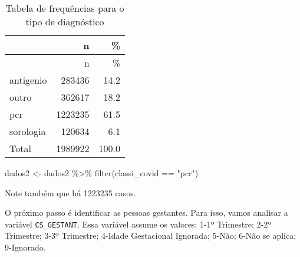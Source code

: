 \documentclass[
]{article}
\newenvironment{Shaded}{\begin{snugshade}}{\end{snugshade}}
\newcommand{\AttributeTok}[1]{\textcolor[rgb]{0.77,0.63,0.00}{#1}}
\newcommand{\CommentTok}[1]{\textcolor[rgb]{0.56,0.35,0.01}{\textit{#1}}}
\newcommand{\ConstantTok}[1]{\textcolor[rgb]{0.00,0.00,0.00}{#1}}
\newcommand{\DecValTok}[1]{\textcolor[rgb]{0.00,0.00,0.81}{#1}}
\newcommand{\FunctionTok}[1]{\textcolor[rgb]{0.00,0.00,0.00}{#1}}
\newcommand{\NormalTok}[1]{#1}
\newcommand{\OtherTok}[1]{\textcolor[rgb]{0.56,0.35,0.01}{#1}}
\newcommand{\SpecialCharTok}[1]{\textcolor[rgb]{0.00,0.00,0.00}{#1}}
\newcommand{\StringTok}[1]{\textcolor[rgb]{0.31,0.60,0.02}{#1}}
\begin{document}
\begin{longtable}[]{@{}lrr@{}}
\caption{Tabela de frequências para o tipo de
diagnóstico}\tabularnewline
\toprule
& n & \% \\
\midrule
\endfirsthead
\toprule
& n & \% \\
\midrule
\endhead
antigenio & 283436 & 14.2 \\
outro & 362617 & 18.2 \\
pcr & 1223235 & 61.5 \\
sorologia & 120634 & 6.1 \\
Total & 1989922 & 100.0 \\
\bottomrule
\end{longtable}

\begin{Shaded}
\begin{Highlighting}[]
\NormalTok{dados2 }\OtherTok{\textless{}{-}}\NormalTok{ dados2 }\SpecialCharTok{\%\textgreater{}\%} 
  \FunctionTok{filter}\NormalTok{(classi\_covid }\SpecialCharTok{==} \StringTok{"pcr"}\NormalTok{)}
\end{Highlighting}
\end{Shaded}

Note também que há 1223235 casos.

O próximo passo é identificar as pessoas gestantes. Para isso, vamos
analisar a variável \texttt{CS\_GESTANT}. Essa variável assume os
valores: 1-1º Trimestre; 2-2º Trimestre; 3-3º Trimestre; 4-Idade
Gestacional Ignorada; 5-Não; 6-Não se aplica; 9-Ignorado.

\begin{Shaded}
\end{Shaded}
\end{document}
